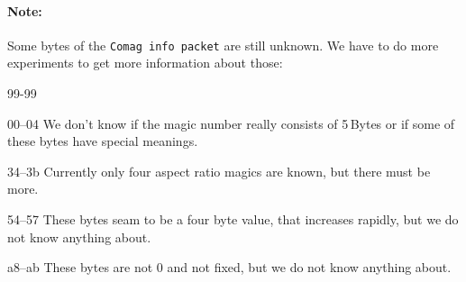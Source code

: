 \documentclass{scrartcl}
\begin{document}
\paragraph{Note:} Some bytes of the \texttt{Comag info packet} are still
unknown. We have to do more experiments to get more information about those:
\begin{labeling}[:]{99-99}
\item[00--04] We don't know if the magic number really consists of 5\,Bytes or
  if some of these bytes have special meanings.
\item[34--3b] Currently only four aspect ratio magics are known, but there
  must be more.
\item[54--57] These bytes seam to be a four byte value, that increases
  rapidly, but we do not know anything about.
\item[a8--ab] These bytes are not 0 and not fixed, but we do not know anything
  about. 
\end{labeling}
\end{document}
